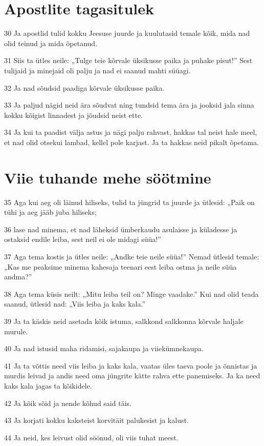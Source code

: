 \section*{Apostlite tagasitulek}

\par 30 Ja apostlid tulid kokku Jeesuse juurde ja kuulutasid temale kõik, mida nad olid teinud ja mida õpetanud.
\par 31 Siis ta ütles neile: „Tulge teie kõrvale üksikusse paika ja puhake pisut!” Sest tulijaid ja minejaid oli palju ja nad ei saanud mahti süüagi.
\par 32 Ja nad sõudsid paadiga kõrvale üksikusse paika.
\par 33 Ja paljud nägid neid ära sõudvat ning tundsid tema ära ja jooksid jala sinna kokku kõigist linnadest ja jõudsid neist ette.
\par 34 Ja kui ta paadist välja astus ja nägi palju rahvast, hakkas tal neist hale meel, et nad olid otsekui lambad, kellel pole karjast. Ja ta hakkas neid pikalt õpetama.

\section*{Viie tuhande mehe söötmine}

\par 35 Aga kui aeg oli läinud hiliseks, tulid ta jüngrid ta juurde ja ütlesid: „Paik on tühi ja aeg jääb juba hiliseks;
\par 36 lase nad minema, et nad läheksid ümberkaudu asulaisse ja küladesse ja ostaksid endile leiba, sest neil ei ole midagi süüa!”
\par 37 Aga tema kostis ja ütles neile: „Andke teie neile süüa!” Nemad ütlesid temale: „Kas me peaksime minema kahesaja teenari eest leiba ostma ja neile süüa andma?”
\par 38 Aga tema küsis neilt: „Mitu leiba teil on? Minge vaadake.” Kui nad olid teada saanud, ütlesid nad: „Viis leiba ja kaks kala.”
\par 39 Ja ta käskis neid asetada kõik istuma, salkkond salkkonna kõrvale haljale murule.
\par 40 Ja nad istusid maha ridamisi, sajakaupa ja viiekümnekaupa.
\par 41 Ja ta võttis need viis leiba ja kaks kala, vaatas üles taeva poole ja õnnistas ja murdis leivad ja andis need oma jüngrite kätte rahva ette panemiseks. Ja ka need kaks kala jagas ta kõikidele.
\par 42 Ja kõik sõid ja nende kõhud said täis.
\par 43 Ja korjati kokku kaksteist korvitäit palukesist ja kalust.
\par 44 Ja neid, kes leivust olid söönud, oli viis tuhat meest.

